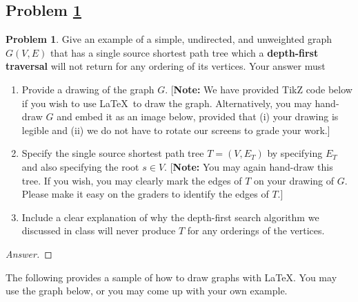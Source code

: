 \documentclass[11pt]{article}
\theoremstyle{definition}
\theoremstyle{definition}
\newtheorem{required}{Problem}
\theoremstyle{definition}
\begin{document}
\subsection{Problem \ref{DFS2}} 
\begin{required} \label{DFS2}
Give an example of a simple, undirected, and unweighted graph $G(V, E)$ that has a single source shortest path tree which a \textbf{depth-first traversal} will not return for any ordering of its vertices. 
    Your answer must
    \begin{enumerate}[label=(\alph*)]
    	\item Provide a drawing of the graph $G$. [\textbf{Note:} We have provided TikZ code below if you wish to use \LaTeX \ to draw the graph. Alternatively, you may hand-draw $G$ and embed it as an image below, provided that (i) your drawing is legible and (ii) we do not have to rotate our screens to grade your work.]
    	\item Specify the single source shortest path tree $T = (V,E_T)$ by specifying $E_T$ and also specifying the root $s \in V$. [\textbf{Note:} You may again hand-draw this tree. If you wish, you may clearly mark the edges of $T$ on your drawing of $G$. Please make it easy on the graders to identify the edges of $T$.] 
    	\item Include a clear explanation of why the depth-first search algorithm we discussed in class will never produce $T$ for any orderings of the vertices.
    \end{enumerate}

\end{required}

\noindent 
\begin{proof}[Answer]
\end{proof}


\noindent The following provides a sample of how to draw graphs with \LaTeX. You may use the graph below, or you may come up with your own example.
\begin{center}
\end{center}
\end{document}

